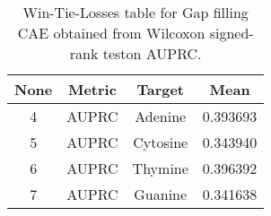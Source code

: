 \begin{table}[H]
\centering
\begin{tabular}{|c|c|c|c|}

 \textbf{None} & \textbf{Metric} & \textbf{Target} &  \textbf{Mean} \\
\hline

             4 &           AUPRC &         Adenine &       0.393693 \\
\hline
             5 &           AUPRC &        Cytosine &       0.343940 \\
\hline
             6 &           AUPRC &         Thymine &       0.396392 \\
\hline
             7 &           AUPRC &         Guanine &       0.341638 \\
\hline

\end{tabular}
\caption{Win-Tie-Losses table for Gap filling CAE obtained from Wilcoxon signed-rank teston AUPRC.}
\label{tab:gap_filling_cae_nucleotides_means}
\end{table}